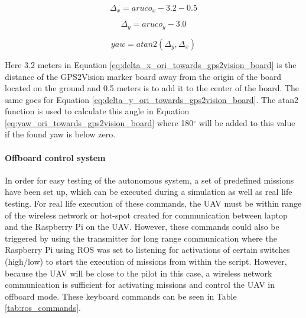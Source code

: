 \documentclass[../Head/report.tex]{subfiles}
\begin{document}
\begin{equation}
	\Delta_x = aruco_x - 3.2 - 0.5
	\label{eq:delta_x_ori_towards_gps2vision_board}
\end{equation}

\begin{equation}
	\Delta_y = aruco_y - 3.0
	\label{eq:delta_y_ori_towards_gps2vision_board}
\end{equation}

\begin{equation}
	yaw = atan2(\Delta_y, \Delta_x)
	\label{eq:yaw_ori_towards_gps2vision_board}
\end{equation}

Here 3.2 meters in Equation \ref{eq:delta_x_ori_towards_gps2vision_board} is the distance of the GPS2Vision marker board away from the origin of the board located on the ground and 0.5 meters is to add it to the center of the board. The same goes for Equation \ref{eq:delta_y_ori_towards_gps2vision_board}. The atan2 function is used to calculate this angle in Equation \ref{eq:yaw_ori_towards_gps2vision_board} where 180$^{\circ}$ will be added to this value if the found yaw is below zero. 


\paragraph{Offboard control system}
\label{sec:offboard_control_system}

In order for easy testing of the autonomous system, a set of predefined missions have been set up, which can be executed during a simulation as well as real life testing. For real life execution of these commands, the UAV must be within range of the wireless network or hot-spot created for communication between laptop and the Raspberry Pi on the UAV. However, these commands could also be triggered by using the transmitter for long range communication where the Raspberry Pi using ROS was set to listening for activations of certain switches (high/low) to start the execution of missions from within the script. However, because the UAV will be close to the pilot in this case, a wireless network communication is sufficient for activating missions and control the UAV in offboard mode. These keyboard commands can be seen in Table \ref{tab:ros_commands}.  
\end{document}
